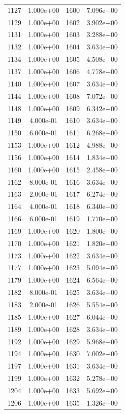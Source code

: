 \documentclass[12pt]{article}
\begin{document}
\begin{longtable}{@{}cccc@{}}
1127 & 1.000e+00 & 1600 & 7.096e+00 \\
1129 & 1.000e+00 & 1602 & 3.902e+00 \\
1131 & 1.000e+00 & 1603 & 3.288e+00 \\
1132 & 1.000e+00 & 1604 & 3.634e+00 \\
1134 & 1.000e+00 & 1605 & 4.508e+00 \\
1137 & 1.000e+00 & 1606 & 4.778e+00 \\
1140 & 1.000e+00 & 1607 & 3.634e+00 \\
1144 & 1.000e+00 & 1608 & 7.072e+00 \\
1148 & 1.000e+00 & 1609 & 6.342e+00 \\
1149 & 4.000e-01 & 1610 & 3.634e+00 \\
1150 & 6.000e-01 & 1611 & 6.268e+00 \\
1153 & 1.000e+00 & 1612 & 4.988e+00 \\
1156 & 1.000e+00 & 1614 & 1.834e+00 \\
1160 & 1.000e+00 & 1615 & 2.458e+00 \\
1162 & 8.000e-01 & 1616 & 3.634e+00 \\
1163 & 2.000e-01 & 1617 & 6.274e+00 \\
1164 & 4.000e-01 & 1618 & 6.340e+00 \\
1166 & 6.000e-01 & 1619 & 1.770e+00 \\
1169 & 1.000e+00 & 1620 & 1.800e+00 \\
1170 & 1.000e+00 & 1621 & 1.820e+00 \\
1173 & 1.000e+00 & 1622 & 3.634e+00 \\
1177 & 1.000e+00 & 1623 & 5.094e+00 \\
1179 & 1.000e+00 & 1624 & 6.564e+00 \\
1182 & 8.000e-01 & 1625 & 3.634e+00 \\
1183 & 2.000e-01 & 1626 & 5.554e+00 \\
1185 & 1.000e+00 & 1627 & 6.044e+00 \\
1189 & 1.000e+00 & 1628 & 3.634e+00 \\
1192 & 1.000e+00 & 1629 & 5.968e+00 \\
1194 & 1.000e+00 & 1630 & 7.002e+00 \\
1197 & 1.000e+00 & 1631 & 3.634e+00 \\
1199 & 1.000e+00 & 1632 & 5.278e+00 \\
1204 & 1.000e+00 & 1633 & 5.692e+00 \\
1206 & 1.000e+00 & 1635 & 1.326e+00 \\

\end{longtable}
\end{document}
